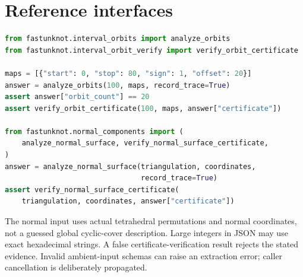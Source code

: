 \documentclass[11pt,a4paper]{article}
\theoremstyle{definition}\newtheorem{definition}[theorem]{Definition}
\theoremstyle{remark}\newtheorem{remark}[theorem]{Remark}
\begin{document}
\section{Reference interfaces}

\begin{lstlisting}[language=Python]
from fastunknot.interval_orbits import analyze_orbits
from fastunknot.interval_orbit_verify import verify_orbit_certificate

maps = [{"start": 0, "stop": 80, "sign": 1, "offset": 20}]
answer = analyze_orbits(100, maps, record_trace=True)
assert answer["orbit_count"] == 20
assert verify_orbit_certificate(100, maps, answer["certificate"])

from fastunknot.normal_components import (
    analyze_normal_surface, verify_normal_surface_certificate,
)
answer = analyze_normal_surface(triangulation, coordinates,
                                record_trace=True)
assert verify_normal_surface_certificate(
    triangulation, coordinates, answer["certificate"])
\end{lstlisting}

The normal input uses actual tetrahedral permutations and normal
coordinates, not a guessed global cyclic-cover description. Large integers
in JSON may use exact hexadecimal strings. A false certificate-verification
result rejects the stated evidence. Invalid ambient-input schemas can raise
an extraction error; caller cancellation is deliberately propagated.
\end{document}
